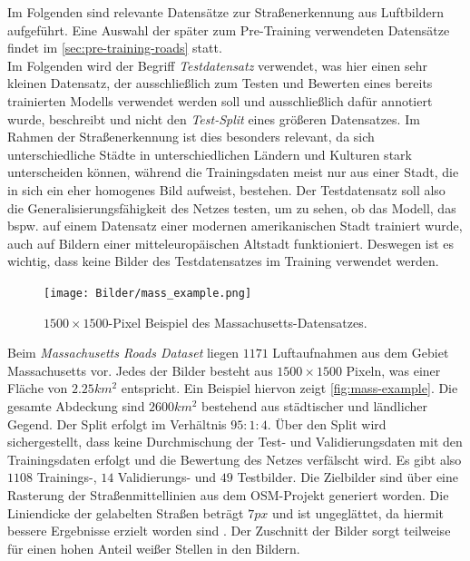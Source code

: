 Im Folgenden sind relevante Datensätze zur Straßenerkennung aus Luftbildern aufgeführt. 
Eine Auswahl der später zum Pre-Training verwendeten Datensätze findet im \autoref{sec:pre-training-roads} statt.\\
Im Folgenden wird der Begriff \textit{Testdatensatz} verwendet, was hier einen sehr kleinen Datensatz, 
der ausschließlich zum Testen und Bewerten eines bereits 
trainierten Modells verwendet werden soll und ausschließlich dafür annotiert wurde, beschreibt 
und nicht den \textit{Test-Split} eines größeren Datensatzes. 
Im Rahmen der Straßenerkennung ist dies besonders relevant, 
da sich unterschiedliche Städte in unterschiedlichen Ländern und Kulturen stark unterscheiden können, 
während die Trainingsdaten meist nur aus einer Stadt, die in sich ein eher homogenes Bild aufweist, bestehen.
Der Testdatensatz soll also die Generalisierungsfähigkeit des Netzes testen, um zu sehen,
ob das Modell, das bspw. auf einem Datensatz einer modernen amerikanischen Stadt trainiert wurde, 
auch auf Bildern einer mitteleuropäischen Altstadt funktioniert. Deswegen ist es wichtig, 
dass keine Bilder des Testdatensatzes im Training verwendet werden. 

\begin{figure}
	\centering
	\vspace{-20pt} %
	\texttt{[image: Bilder/mass\_example.png]}
	\vspace{-5pt}
	\caption[$1500{\times}1500$-Pixel Beispiel des Massachusetts-Datensatzes.]{\unskip}
	$1500{\times}1500$-Pixel Beispiel des Massachusetts-Datensatzes.
	\label{fig:mass-example}
\end{figure}

Beim \textit{Massachusetts Roads Dataset} liegen $1171$ Luftaufnahmen aus dem Gebiet Massachusetts vor.
Jedes der Bilder besteht aus $1500{\times}1500$ Pixeln, was einer Fläche von $2.25 km^2$ entspricht.
Ein Beispiel hiervon zeigt \autoref{fig:mass-example}.
Die gesamte Abdeckung sind $2600 km^2$ bestehend aus städtischer und ländlicher Gegend.
Der Split erfolgt im Verhältnis $95:1:4$. 
Über den Split wird sichergestellt, dass keine Durchmischung der Test- und Validierungsdaten mit den Trainingsdaten erfolgt und die Bewertung des Netzes verfälscht wird.
Es gibt also $1108$ Trainings-, $14$ Validierungs- und $49$ Testbilder.
Die Zielbilder sind über eine Rasterung der Straßenmittellinien aus dem \ac{OSM}-Projekt generiert worden.
Die Liniendicke der gelabelten Straßen beträgt $7 px$ und ist ungeglättet, da hiermit bessere Ergebnisse erzielt worden sind \cite{Mnih.2013}.
Der Zuschnitt der Bilder sorgt teilweise für einen hohen Anteil weißer Stellen in den Bildern.

